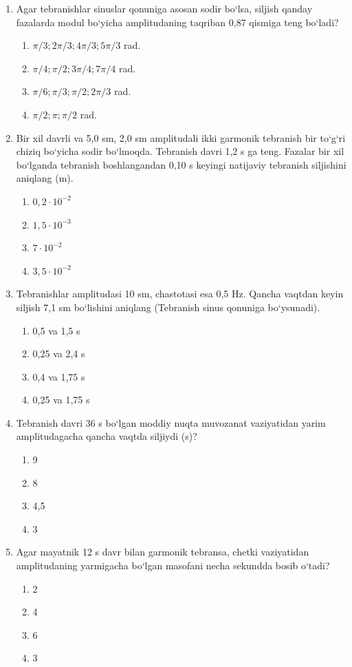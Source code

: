 \begin{enumerate}
\item Agar tebranishlar sinuslar qonuniga asosan sodir bo‘lsa, siljish qanday fazalarda modul bo‘yicha amplitudaning taqriban 0,87 qismiga teng bo‘ladi?
\begin{enumerate}[label=\Alph*)]
\item $\pi/3; 2\pi/3; 4\pi/3; 5\pi/3$ rad.
\item $\pi/4; \pi/2; 3\pi/4; 7\pi/4$ rad.
\item $\pi/6; \pi/3; \pi/2; 2\pi/3$ rad.
\item $\pi/2; \pi; \pi/2$ rad.
\end{enumerate}

\item Bir xil davrli va 5,0 sm, 2,0 sm amplitudali ikki garmonik tebranish bir to‘g‘ri chiziq bo‘yicha sodir bo‘lmoqda. Tebranish davri 1,2 s ga teng. Fazalar bir xil bo‘lganda tebranish boshlangandan 0,10 s keyingi natijaviy tebranish siljishini aniqlang (m).
\begin{enumerate}[label=\Alph*)]
\item $0,2 \cdot 10^{-2}$
\item $1,5 \cdot 10^{-3}$
\item $7 \cdot 10^{-2}$
\item $3,5 \cdot 10^{-2}$
\end{enumerate}

\item Tebranishlar amplitudasi 10 sm, chastotasi esa 0,5 Hz. Qancha vaqtdan keyin siljish 7,1 sm bo‘lishini aniqlang (Tebranish sinus qonuniga bo‘ysunadi).
\begin{enumerate}[label=\Alph*)]
\item 0,5 va 1,5 s
\item 0,25 va 2,4 s
\item 0,4 va 1,75 s
\item 0,25 va 1,75 s
\end{enumerate}

\item Tebranish davri 36 s bo‘lgan moddiy nuqta muvozanat vaziyatidan yarim amplitudagacha qancha vaqtda siljiydi (s)?
\begin{enumerate}[label=\Alph*)]
\item 9
\item 8
\item 4,5
\item 3
\end{enumerate}

\item Agar mayatnik 12 s davr bilan garmonik tebransa, chetki vaziyatidan amplitudaning yarmigacha bo‘lgan masofani necha sekundda bosib o‘tadi?
\begin{enumerate}[label=\Alph*)]
\item 2
\item 4
\item 6
\item 3
\end{enumerate}


\end{enumerate}
